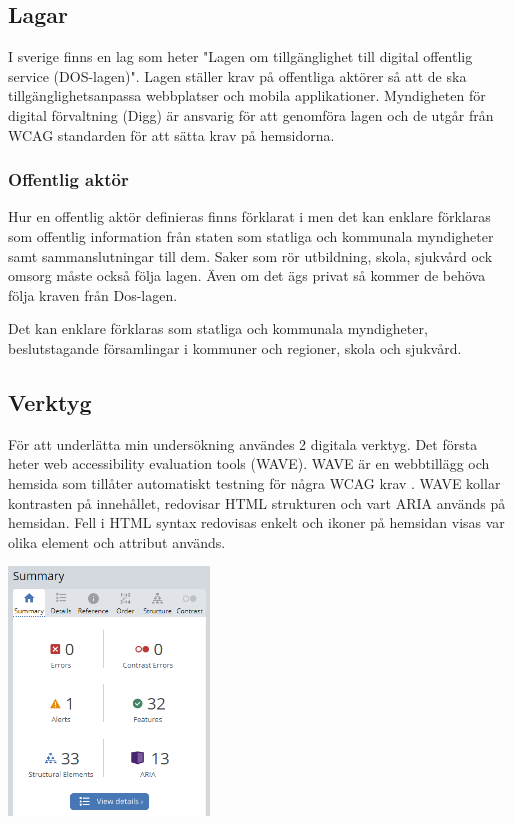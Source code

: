 \documentclass[11p]{article}
\begin{document}
    \subsection{Lagar}
    I sverige finns en lag som heter "Lagen om tillgänglighet till digital offentlig service (DOS-lagen)".\parencite{Dos-lagen}
    Lagen ställer krav på offentliga aktörer så att de ska tillgänglighetsanpassa webbplatser och mobila applikationer.
    Myndigheten för digital förvaltning (Digg) är ansvarig för att genomföra lagen och de utgår från WCAG standarden för att sätta krav på hemsidorna.

    \subsubsection{Offentlig aktör}
    Hur en offentlig aktör definieras finns förklarat i \textcite{Dos-lagen} men det kan enklare förklaras som offentlig information från staten som statliga och kommunala myndigheter samt sammanslutningar till dem.
    Saker som rör utbildning, skola, sjukvård ock omsorg måste också följa lagen.
    Även om det ägs privat så kommer de behöva följa kraven från Dos-lagen.

    Det kan enklare förklaras som statliga och kommunala myndigheter, beslutstagande församlingar i kommuner och regioner, skola och sjukvård.\parencite{Om_Dos-lage}


    \subsection{Verktyg}
    För att underlätta min undersökning användes 2 digitala verktyg.
    Det första heter web accessibility evaluation tools (WAVE).
    WAVE är en webbtillägg och hemsida som tillåter automatiskt testning för några WCAG krav \parencite{WAVE}.
    WAVE kollar kontrasten på innehållet, redovisar HTML strukturen och vart ARIA används på hemsidan.
    Fell i HTML syntax redovisas enkelt och ikoner på hemsidan visas var olika element och attribut används.

    \includegraphics[width=0.4\textwidth]{../images/WAVE.png}
\end{document}
